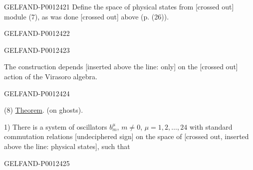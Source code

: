 \begin{GelfandAdjacentEvidence}{GELFAND-P001242}{1}
Define the space of physical states from [crossed out] module (7), as was done [crossed out] above (p. (26)).
\end{GelfandAdjacentEvidence}
\begin{GelfandAdjacentEvidence}{GELFAND-P001242}{2}

\end{GelfandAdjacentEvidence}
\begin{GelfandAdjacentEvidence}{GELFAND-P001242}{3}


The construction depends [inserted above the line: only] on the [crossed out] action of the Virasoro algebra.
\end{GelfandAdjacentEvidence}
\begin{GelfandAdjacentEvidence}{GELFAND-P001242}{4}


(8) \underline{Theorem}. (on ghosts).

1) There is a system of oscillators $b_m^\mu$, $m\ne0$, $\mu=1,2,\ldots,24$
with standard commutation relations [undeciphered sign] on the space of [crossed out, inserted above the line: physical states], such that
\end{GelfandAdjacentEvidence}
\begin{GelfandAdjacentEvidence}{GELFAND-P001242}{5}

\end{GelfandAdjacentEvidence}

